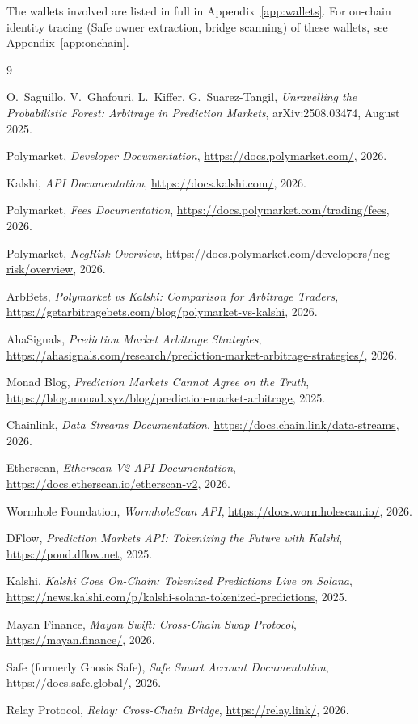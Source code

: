 \documentclass[11pt,a4paper]{article}
\begin{document}
The wallets involved are listed in full in Appendix~\ref{app:wallets}. For on-chain identity tracing (Safe owner extraction, bridge scanning) of these wallets, see Appendix~\ref{app:onchain}.

\begin{thebibliography}{9}

O.~Saguillo, V.~Ghafouri, L.~Kiffer, G.~Suarez-Tangil,
\emph{Unravelling the Probabilistic Forest: Arbitrage in Prediction Markets},
arXiv:2508.03474, August 2025.

Polymarket, \emph{Developer Documentation},
\url{https://docs.polymarket.com/}, 2026.

Kalshi, \emph{API Documentation},
\url{https://docs.kalshi.com/}, 2026.

Polymarket, \emph{Fees Documentation},
\url{https://docs.polymarket.com/trading/fees}, 2026.

Polymarket, \emph{NegRisk Overview},
\url{https://docs.polymarket.com/developers/neg-risk/overview}, 2026.

ArbBets, \emph{Polymarket vs Kalshi: Comparison for Arbitrage Traders},
\url{https://getarbitragebets.com/blog/polymarket-vs-kalshi}, 2026.

AhaSignals, \emph{Prediction Market Arbitrage Strategies},
\url{https://ahasignals.com/research/prediction-market-arbitrage-strategies/}, 2026.

Monad Blog, \emph{Prediction Markets Cannot Agree on the Truth},
\url{https://blog.monad.xyz/blog/prediction-market-arbitrage}, 2025.

Chainlink, \emph{Data Streams Documentation},
\url{https://docs.chain.link/data-streams}, 2026.

Etherscan, \emph{Etherscan V2 API Documentation},
\url{https://docs.etherscan.io/etherscan-v2}, 2026.

Wormhole Foundation, \emph{WormholeScan API},
\url{https://docs.wormholescan.io/}, 2026.

DFlow, \emph{Prediction Markets API: Tokenizing the Future with Kalshi},
\url{https://pond.dflow.net}, 2025.

Kalshi, \emph{Kalshi Goes On-Chain: Tokenized Predictions Live on Solana},
\url{https://news.kalshi.com/p/kalshi-solana-tokenized-predictions}, 2025.

Mayan Finance, \emph{Mayan Swift: Cross-Chain Swap Protocol},
\url{https://mayan.finance/}, 2026.

Safe (formerly Gnosis Safe), \emph{Safe Smart Account Documentation},
\url{https://docs.safe.global/}, 2026.

Relay Protocol, \emph{Relay: Cross-Chain Bridge},
\url{https://relay.link/}, 2026.

\end{thebibliography}
\end{document}

